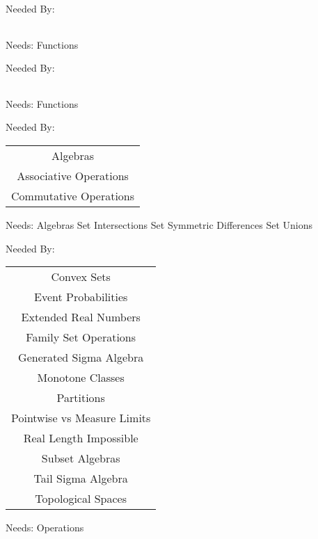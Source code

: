 Needed By: \begin{tabular}{c}
\end{tabular}
\clearpage{}

\newpage
\label{function_extensions}


\clearpage
Needs:  Functions 

Needed By: \begin{tabular}{c}
\end{tabular}
\clearpage{}

\newpage
\label{operations}


\clearpage
Needs:  Functions 

Needed By: \begin{tabular}{c} Algebras \\  Associative Operations \\  Commutative Operations \\ 
\end{tabular}
\clearpage{}

\newpage
\label{set_operations}


\clearpage
Needs:  Algebras  Set Intersections  Set Symmetric Differences  Set Unions 

Needed By: \begin{tabular}{c} Convex Sets \\  Event Probabilities \\  Extended Real Numbers \\  Family Set Operations \\  Generated Sigma Algebra \\  Monotone Classes \\  Partitions \\  Pointwise vs Measure Limits \\  Real Length Impossible \\  Subset Algebras \\  Tail Sigma Algebra \\  Topological Spaces \\ 
\end{tabular}
\clearpage{}

\newpage
\label{algebras}


\clearpage
Needs:  Operations 

